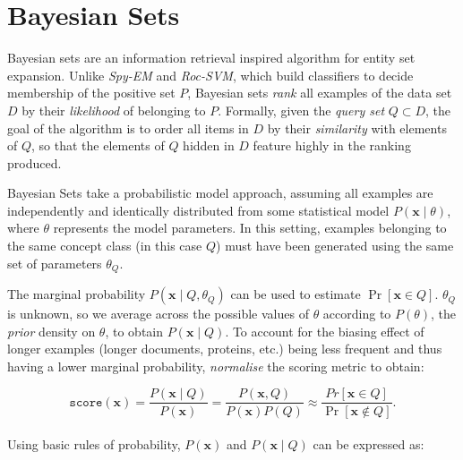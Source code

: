 \documentclass[12pt,twoside,notitlepage,amsart]{report} %
\begin{document}
	\section{Bayesian Sets} %
	
	
	Bayesian sets \cite{Ghahramani06} are an information retrieval inspired algorithm for entity set expansion. Unlike \emph{Spy-EM} and \emph{Roc-SVM}, which build classifiers to decide membership of the positive set $P$, Bayesian sets \emph{rank} all examples of the data set $D$ by their \emph{likelihood} of belonging to $P$. Formally, given the \emph{query set} $Q \subset D$, the goal of the algorithm is to order all items in $D$ by their \emph{similarity} with elements of $Q$, so that the elements of $Q$ hidden in $D$ feature highly in the ranking produced. %
	
	Bayesian Sets take a probabilistic model approach, assuming all examples are independently and identically distributed from some statistical model $P(\mathbf{x} \mid \theta)$, where $\theta$ represents the model parameters. In this setting, examples belonging to the same concept class (in this case $Q$) must have been generated using the same set of parameters $\theta_{Q}$. 
	
	The marginal probability $P(\mathbf{x} \mid Q, \theta_Q)$ can be used to estimate $\Pr[\mathbf{x} \in Q]$. $\theta_Q$ is unknown, so we average across the possible values of $\theta$ according to $P(\theta)$, the \emph{prior} density on $\theta$, to obtain $P(\mathbf{x} \mid Q)$. To account for the biasing effect of longer examples (longer documents, proteins, etc.) being less frequent and thus having a lower marginal probability, \emph{normalise} the scoring metric to obtain:
	
	\begin{equation} \displaystyle \texttt{score}(\mathbf{x}) =  \frac{ P\left( \mathbf{x} \mid Q \right) }{ P(\mathbf{x}) } = \frac{P(\mathbf{x}, Q)}{ P(\mathbf{x}) P(Q) } \approx \frac{Pr[\mathbf{x} \in Q]}{\Pr[\mathbf{x} \notin Q]}. 
	\end{equation} \\
	
	Using basic rules of probability, $P(\mathbf{x})$ and $P(\mathbf{x} \mid Q)$ can be expressed as:
	
\end{document}
